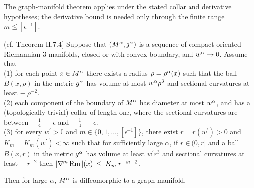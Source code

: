 \begin{remark}
\label{rem:kl-thin-part-graph-manifold-estimates-thick-thin-geometry}



The graph-manifold theorem applies under the stated collar and derivative hypotheses; the derivative bound is needed only through the finite range $m\leq[\epsilon^{-1}]$.
\end{remark}

\begin{theorem}
  \label{thm:kl-thin-part-graph-manifold-existence-thick-thin-geometry-3}
 (cf. Theorem II.7.4) \label{thmII.7.4second}
Suppose that $(M^\alpha, g^\alpha)$ is a sequence of compact oriented Riemannian
$3$-manifolds, closed or with convex boundary, and $w^\alpha \rightarrow 0$.
Assume that \\
(1) for each point $x \in M^\alpha$ there exists a radius $\rho = \rho^\alpha(x)$
such that
the ball $B(x, \rho)$ in the metric $g^\alpha$ has volume at most
$w^\alpha \rho^3$ and sectional curvatures at least $- \: \rho^{-2}$.\\
(2) each component of the boundary of $M^\alpha$ has diameter at most
$w^\alpha$, and has a (topologically trivial) collar of length one, where
the sectional curvatures are between $- \: \frac14 \: - \: \epsilon$ and
$- \: \frac14 \: - \: \epsilon$. \\
(3) for every $w^\prime > 0$ and $m  \in \{0, 1, \ldots, [\epsilon^{-1}]\}$,
there exist $\overline{r} = \overline{r}(w^\prime) > 0$
and $K_m = K_m(w^\prime) <\infty$ such that for sufficiently
large $\alpha$, if $r \in (0, \overline{r}]$
and a ball $B(x,r)$ in the metric $g^\alpha$
has volume at least $w^\prime r^3$ and sectional curvatures at least
$- \: r^{-2}$ then $|\nabla^m \operatorname{Rm}|(x) \: \le \: K_m \: r^{-m-2}$.

Then for large $\alpha$, $M^\alpha$ is diffeomorphic to a graph manifold.
\end{theorem}

\begin{remark}
\label{rem:kl-thin-part-graph-manifold-estimates-noncollapsing}

\end{remark}

